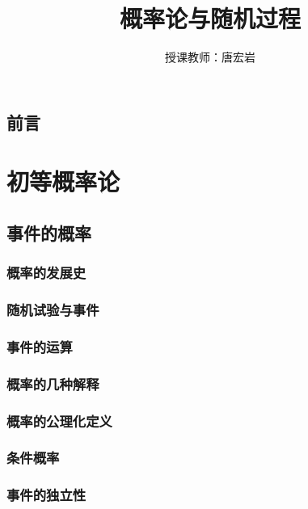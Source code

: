 \documentclass[zihao=-4,linespread=1.5,a4paper,heading=true,oneside]{ctexbook}
\title{概率论与随机过程}
\author{授课教师：唐宏岩}
\date{}
\theoremstyle{definition}
\begin{document}
\maketitle

\chapter*{前言}\label{chap:preface}

\tableofcontents

\newpage
{}
\part{初等概率论}\label{part:1}

\chapter{事件的概率}\label{chap:1}
\section{概率的发展史}\label{sec:1.1}

\section{随机试验与事件}\label{sec:1.2}

\section{事件的运算}\label{sec:1.3}

\section{概率的几种解释}\label{sec:1.4}

\section{概率的公理化定义}\label{sec:1.5}

\section{条件概率}\label{sec:1.6}

\section{事件的独立性}\label{sec:1.7}

\end{document}
